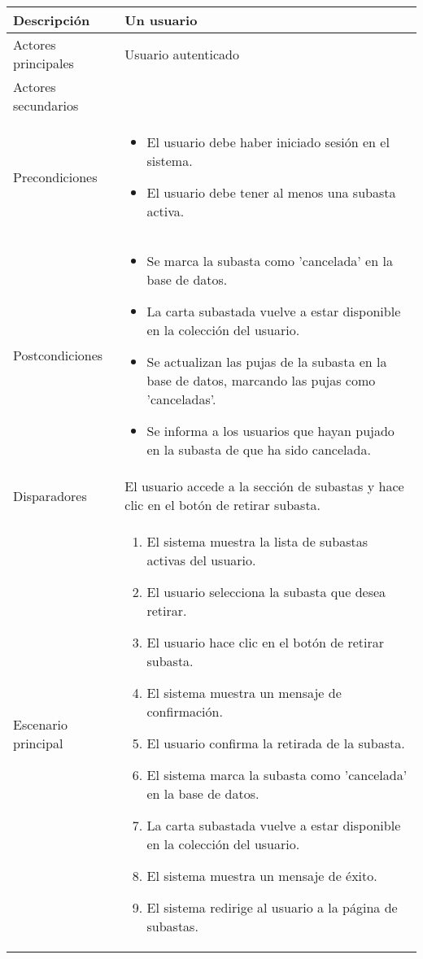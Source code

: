 \begin{longtable}{
    >{\columncolor{lightgreen!20}}p{4cm}
    p{12cm}
    }
    \midrule
    Descripción & Un usuario  \\
    \midrule
    Actores principales & Usuario autenticado \\
    \midrule
    Actores secundarios &  \\
    \midrule
    Precondiciones & \begin{itemize}[nosep,leftmargin=*]
        \item El usuario debe haber iniciado sesión en el sistema.
        \item El usuario debe tener al menos una subasta activa.
    \end{itemize} \\
    \midrule
    Postcondiciones & \begin{itemize}[nosep,leftmargin=*]
        \item Se marca la subasta como 'cancelada' en la base de datos.
        \item La carta subastada vuelve a estar disponible en la colección del usuario.
        \item Se actualizan las pujas de la subasta en la base de datos, marcando las pujas como 'canceladas'.
        \item Se informa a los usuarios que hayan pujado en la subasta de que ha sido cancelada.
    \end{itemize} \\
    \midrule
    Disparadores & El usuario accede a la sección de subastas y hace clic en el botón de retirar subasta. \\
    \midrule
    Escenario principal & \begin{enumerate}[nosep,leftmargin=*]
        \item El sistema muestra la lista de subastas activas del usuario.
        \item El usuario selecciona la subasta que desea retirar.
        \item El usuario hace clic en el botón de retirar subasta.
        \item El sistema muestra un mensaje de confirmación.
        \item El usuario confirma la retirada de la subasta.
        \item El sistema marca la subasta como 'cancelada' en la base de datos.
        \item La carta subastada vuelve a estar disponible en la colección del usuario.
        \item El sistema muestra un mensaje de éxito.
        \item El sistema redirige al usuario a la página de subastas.

\end{enumerate}
\end{longtable}
